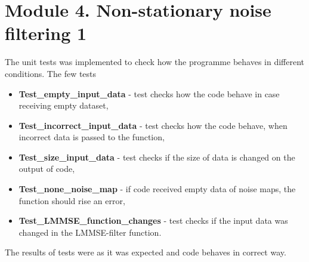 \section{Module 4. Non-stationary noise filtering 1}

The unit tests was implemented to check how the programme behaves in different conditions. The few tests

\begin{itemize}

	\item \textbf{Test\_empty\_input\_data} - test checks how the code behave in case receiving empty dataset,
	\item \textbf{Test\_incorrect\_input\_data} - test checks how the code behave, when incorrect data is passed to the function,
	\item \textbf{Test\_size\_input\_data} - test checks if the size of data is changed on the output of code,
	\item \textbf{Test\_none\_noise\_map} - if code received empty data of noise maps, the function should rise an error,
	\item \textbf{Test\_LMMSE\_function\_changes} - test checks if the input data was changed in the LMMSE-filter function.

\end{itemize}

The results of tests were as it was expected and code behaves in correct way.